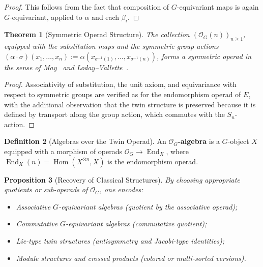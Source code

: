 \documentclass[11pt,a4paper,openany]{book}
\theoremstyle{plain}
\newtheorem{theorem}{Theorem}[chapter]
\newtheorem{proposition}[theorem]{Proposition}
\theoremstyle{definition}
\newtheorem{definition}[theorem]{Definition}
\newcommand{\actspace}{E}
\newcommand{\groupG}{G}
\DeclareMathOperator{\End}{End}
\DeclareMathOperator{\Hom}{Hom}
\begin{document}
\begin{proof}
This follows from the fact that composition of $\groupG$-equivariant maps is again $\groupG$-equivariant, applied to $\alpha$ and each $\beta_i$.
\end{proof}

\begin{theorem}[Symmetric Operad Structure]\label{thm:operad}
The collection $(\mathcal{O}_\groupG(n))_{n \geq 1}$, equipped with the substitution maps and the symmetric group actions $(\alpha \cdot \sigma)(x_1, \ldots, x_n) := \alpha(x_{\sigma^{-1}(1)}, \ldots, x_{\sigma^{-1}(n)})$, forms a symmetric operad in the sense of May~\cite{may1972} and Loday--Vallette~\cite{loday-vallette2012}.
\end{theorem}

\begin{proof}
Associativity of substitution, the unit axiom, and equivariance with respect to symmetric groups are verified as for the endomorphism operad of $\actspace$, with the additional observation that the twin structure is preserved because it is defined by transport along the group action, which commutes with the $S_n$-action.
\end{proof}

\begin{definition}[Algebras over the Twin Operad]\label{def:operad-algebra}
An \textbf{$\mathcal{O}_\groupG$-algebra} is a $\groupG$-object $X$ equipped with a morphism of operads $\mathcal{O}_\groupG \to \End_X$, where $\End_X(n) = \Hom(X^{\otimes n}, X)$ is the endomorphism operad.
\end{definition}

\begin{proposition}[Recovery of Classical Structures]\label{prop:classical-recovery}
By choosing appropriate quotients or sub-operads of $\mathcal{O}_\groupG$, one encodes:
\begin{itemize}
    \item Associative $\groupG$-equivariant algebras (quotient by the associative operad);
    \item Commutative $\groupG$-equivariant algebras (commutative quotient);
    \item Lie-type twin structures (antisymmetry and Jacobi-type identities);
    \item Module structures and crossed products (colored or multi-sorted versions).
\end{itemize}
\end{proposition}
\end{document}
